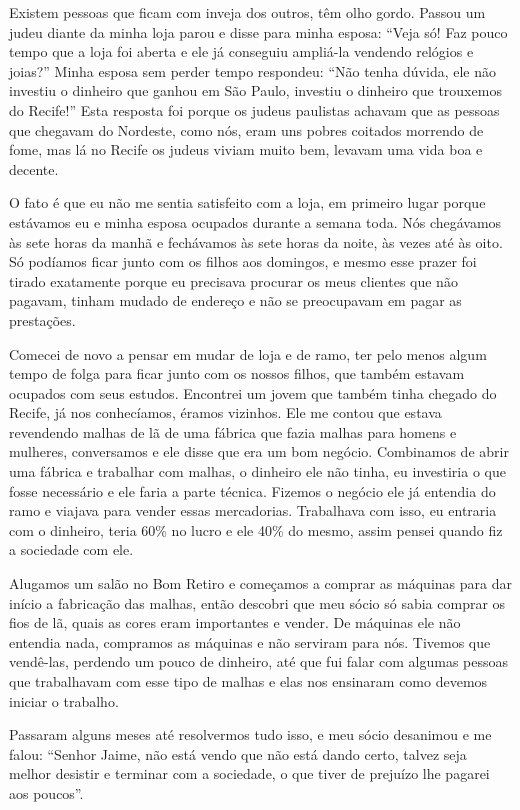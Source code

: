 Existem pessoas que ficam com inveja dos outros, têm olho gordo. Passou
um judeu diante da minha loja parou e disse para minha esposa: ``Veja
só! Faz pouco tempo que a loja foi aberta e ele já conseguiu ampliá-la
vendendo relógios e joias?'' Minha esposa sem perder tempo respondeu:
``Não tenha dúvida, ele não investiu o dinheiro que ganhou em São Paulo,
investiu o dinheiro que trouxemos do Recife!'' Esta resposta foi porque
os judeus paulistas achavam que as pessoas que chegavam do Nordeste,
como nós, eram uns pobres coitados morrendo de fome, mas lá no Recife os
judeus viviam muito bem, levavam uma vida boa e decente.

O fato é que eu não me sentia satisfeito com a loja, em primeiro lugar
porque estávamos eu e minha esposa ocupados durante a semana toda. Nós
chegávamos às sete horas da manhã e fechávamos às sete horas da noite,
às vezes até às oito. Só podíamos ficar junto com os filhos aos
domingos, e mesmo esse prazer foi tirado exatamente porque eu precisava
procurar os meus clientes que não pagavam, tinham mudado de endereço e
não se preocupavam em pagar as prestações.

Comecei de novo a pensar em mudar de loja e de ramo, ter pelo menos
algum tempo de folga para ficar junto com os nossos filhos, que também
estavam ocupados com seus estudos. Encontrei um jovem que também tinha
chegado do Recife, já nos conhecíamos, éramos vizinhos. Ele me contou
que estava revendendo malhas de lã de uma fábrica que fazia malhas para
homens e mulheres, conversamos e ele disse que era um bom negócio.
Combinamos de abrir uma fábrica e trabalhar com malhas, o dinheiro ele
não tinha, eu investiria o que fosse necessário e ele faria a parte
técnica. Fizemos o negócio ele já entendia do ramo e viajava para vender
essas mercadorias. Trabalhava com isso, eu entraria com o dinheiro,
teria 60\% no lucro e ele 40\% do mesmo, assim pensei quando fiz a
sociedade com ele.

Alugamos um salão no Bom Retiro e começamos a comprar as máquinas para
dar início a fabricação das malhas, então descobri que meu sócio só
sabia comprar os fios de lã, quais as cores eram importantes e vender.
De máquinas ele não entendia nada, compramos as máquinas e não serviram
para nós. Tivemos que vendê-las, perdendo um pouco de dinheiro, até que
fui falar com algumas pessoas que trabalhavam com esse tipo de malhas e
elas nos ensinaram como devemos iniciar o trabalho.

Passaram alguns meses até resolvermos tudo isso, e meu sócio desanimou e
me falou: ``Senhor Jaime, não está vendo que não está dando certo,
talvez seja melhor desistir e terminar com a sociedade, o que tiver de
prejuízo lhe pagarei aos poucos''.

